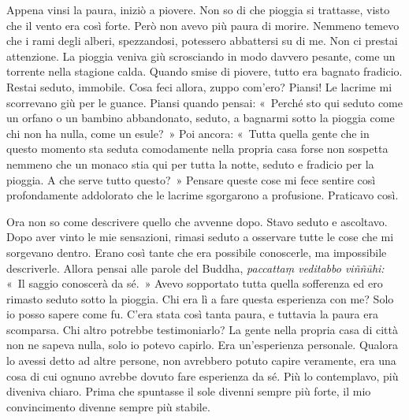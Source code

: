Appena vinsi la paura, iniziò a piovere. Non so di che pioggia si
trattasse, visto che il vento era così forte. Però non avevo più paura
di morire. Nemmeno temevo che i rami degli alberi, spezzandosi,
potessero abbattersi su di me. Non ci prestai attenzione. La pioggia
veniva giù scrosciando in modo davvero pesante, come un torrente nella
stagione calda. Quando smise di piovere, tutto era bagnato fradicio.
Restai seduto, immobile. Cosa feci allora, zuppo com'ero? Piansi! Le
lacrime mi scorrevano giù per le guance. Piansi quando pensai: «~Perché
sto qui seduto come un orfano o un bambino abbandonato, seduto, a
bagnarmi sotto la pioggia come chi non ha nulla, come un esule?~» Poi
ancora: «~Tutta quella gente che in questo momento sta seduta
comodamente nella propria casa forse non sospetta nemmeno che un monaco
stia qui per tutta la notte, seduto e fradicio per la pioggia. A che
serve tutto questo?~» Pensare queste cose mi fece sentire così
profondamente addolorato che le lacrime sgorgarono a profusione.
Praticavo così.

Ora non so come descrivere quello che avvenne dopo. Stavo seduto e
ascoltavo. Dopo aver vinto le mie sensazioni, rimasi seduto a osservare
tutte le cose che mi sorgevano dentro. Erano così tante che era
possibile conoscerle, ma impossibile descriverle. Allora pensai alle
parole del Buddha, \emph{paccattaṃ veditabbo viññūhi:} «~Il saggio
conoscerà da sé.~» Avevo sopportato tutta quella sofferenza ed ero
rimasto seduto sotto la pioggia. Chi era lì a fare questa esperienza con
me? Solo io posso sapere come fu. C'era stata così tanta paura, e
tuttavia la paura era scomparsa. Chi altro potrebbe testimoniarlo? La
gente nella propria casa di città non ne sapeva nulla, solo io potevo
capirlo. Era un'esperienza personale. Qualora lo avessi detto ad altre
persone, non avrebbero potuto capire veramente, era una cosa di cui
ognuno avrebbe dovuto fare esperienza da sé. Più lo contemplavo, più
diveniva chiaro. Prima che spuntasse il sole divenni sempre più forte,
il mio convincimento divenne sempre più stabile.

